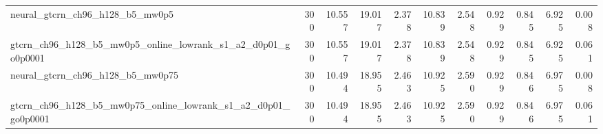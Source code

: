 \begin{table}[t]
\begin{tabular}{lrrrrrrrrrr}
neural_gtcrn_ch96_h128_b5_mw0p5 & 300 & 10.557 & 19.017 & 2.378 & 10.839 & 2.548 & 0.929 & 0.845 & 6.925 & 0.008 \\
gtcrn_ch96_h128_b5_mw0p5_online_lowrank_s1_a2_d0p01_go0p0001 & 300 & 10.557 & 19.017 & 2.378 & 10.839 & 2.548 & 0.929 & 0.845 & 6.925 & 0.061 \\
neural_gtcrn_ch96_h128_b5_mw0p75 & 300 & 10.494 & 18.955 & 2.463 & 10.925 & 2.590 & 0.929 & 0.846 & 6.975 & 0.008 \\
gtcrn_ch96_h128_b5_mw0p75_online_lowrank_s1_a2_d0p01_go0p0001 & 300 & 10.494 & 18.955 & 2.463 & 10.925 & 2.590 & 0.929 & 0.846 & 6.975 & 0.061 \\
\bottomrule
\end{tabular}
\end{table}